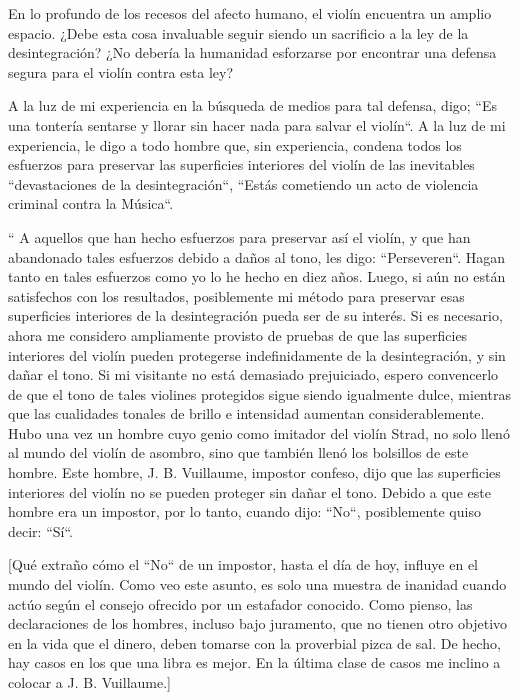 \documentclass[12pt]{book}
\begin{document}
En lo profundo de los recesos del afecto humano, el violín encuentra un amplio espacio. ¿Debe esta cosa invaluable seguir siendo un sacrificio a la ley de la desintegración? ¿No debería la humanidad esforzarse por encontrar una defensa segura para el violín contra esta ley?

A la luz de mi experiencia en la búsqueda de medios para tal defensa, digo; ``Es una tontería sentarse y llorar sin hacer nada para salvar el violín``. A la luz de mi experiencia, le digo a todo hombre que, sin experiencia, condena todos los esfuerzos para preservar las superficies interiores del violín de las inevitables ``devastaciones de la desintegración``, ``Estás cometiendo un acto de violencia criminal contra la Música``.

`` A aquellos que han hecho esfuerzos para preservar así el violín, y que han abandonado tales esfuerzos debido a daños al tono, les digo: ``Perseveren``. Hagan tanto en tales esfuerzos como yo lo he hecho en diez años. Luego, si aún no están satisfechos con los resultados, posiblemente mi método para preservar esas superficies interiores de la desintegración pueda ser de su interés. Si es necesario, ahora me considero ampliamente provisto de pruebas de que las superficies interiores del violín pueden protegerse indefinidamente de la desintegración, y sin dañar el tono. Si mi visitante no está demasiado prejuiciado, espero convencerlo de que el tono de tales violines protegidos sigue siendo igualmente dulce, mientras que las cualidades tonales de brillo e intensidad aumentan considerablemente. Hubo una vez un hombre cuyo genio como imitador del violín Strad, no solo llenó al mundo del violín de asombro, sino que también llenó los bolsillos de este hombre. Este hombre, J. B. Vuillaume, impostor confeso, dijo que las superficies interiores del violín no se pueden proteger sin dañar el tono. Debido a que este hombre era un impostor, por lo tanto, cuando dijo: ``No``, posiblemente quiso decir: ``Sí``.

[Qué extraño cómo el ``No`` de un impostor, hasta el día de hoy, influye en el mundo del violín. Como veo este asunto, es solo una muestra de inanidad cuando actúo según el consejo ofrecido por un estafador conocido. Como pienso, las declaraciones de los hombres, incluso bajo juramento, que no tienen otro objetivo en la vida que el dinero, deben tomarse con la proverbial pizca de sal. De hecho, hay casos en los que una libra es mejor. En la última clase de casos me inclino a colocar a J. B. Vuillaume.]
\end{document}

